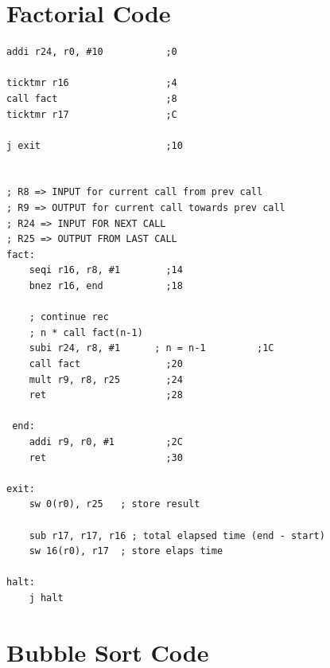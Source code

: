\newpage
\section{Factorial Code}

\begin{lstlisting}[style=mips,caption={Factorial DLX Assembly example},label=asm_factorial]
addi r24, r0, #10           ;0

ticktmr r16                 ;4
call fact                   ;8
ticktmr r17                 ;C

j exit                      ;10


; R8 => INPUT for current call from prev call
; R9 => OUTPUT for current call towards prev call
; R24 => INPUT FOR NEXT CALL
; R25 => OUTPUT FROM LAST CALL
fact:
    seqi r16, r8, #1        ;14
    bnez r16, end           ;18

    ; continue rec
    ; n * call fact(n-1)
    subi r24, r8, #1      ; n = n-1         ;1C
    call fact               ;20 
    mult r9, r8, r25        ;24
    ret                     ;28
 
 end:
    addi r9, r0, #1         ;2C
    ret                     ;30

exit:
    sw 0(r0), r25   ; store result
    
    sub r17, r17, r16 ; total elapsed time (end - start)
    sw 16(r0), r17  ; store elaps time

halt:
    j halt

\end{lstlisting}


\newpage
\section{Bubble Sort Code}


